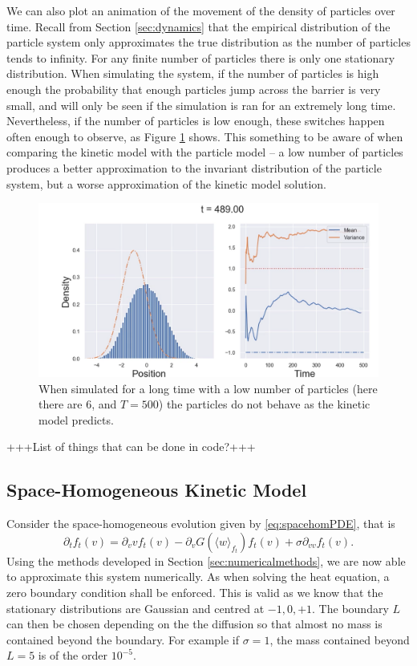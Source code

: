 We can also plot an animation of the movement of the density of particles over time. Recall from Section \ref{sec:dynamics} that the empirical distribution of the particle system only approximates the true distribution as the number of particles tends to infinity. For any finite number of particles there is only one stationary distribution. When simulating the system, if the number of particles is high enough the probability that enough particles jump across the barrier is very small, and will only be seen if the simulation is ran for an extremely long time. Nevertheless, if the number of particles is low enough, these switches happen often enough to observe, as Figure \ref{fig:switch} shows. This something to be aware of when comparing the kinetic model with the particle model -- a low number of particles produces a better approximation to the invariant distribution of the particle system, but a worse approximation of the kinetic model solution.

\begin{figure}
    \centering
    \includegraphics[width=\linewidth]{Figures/switch}
    \caption[Mean Zero Invariant Measure for the Particle System]{When simulated for a long time with a low number of particles (here there are 6, and $T=500$) the particles do not behave as the kinetic model predicts.}
    \label{fig:switch}
\end{figure}

+++List of things that can be done in code?+++

\subsection{Space-Homogeneous Kinetic Model}\label{sec:homkin}
 Consider the space-homogeneous evolution given by \eqref{eq:spacehomPDE}, that is
    \begin{equation}
    \partial_t f_t(v) = \partial_v vf_t(v) - \partial_v G(\langle w \rangle_{f_t})f_t(v) + \sigma \partial_{vv} f_t(v).
    \end{equation}
    Using the methods developed in Section \ref{sec:numericalmethods}, we are now able to approximate this system numerically. As when solving the heat equation, a zero boundary condition shall be enforced. This is valid as we know that the stationary distributions are Gaussian and centred at $-1,0,+1$. The boundary $L$ can then be chosen depending on the the diffusion so that almost no mass is contained beyond the boundary. For example if $\sigma = 1$, the mass contained beyond $L=5$ is of the order $10^{-5}$. 
    
